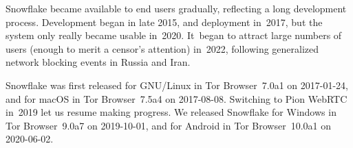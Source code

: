 \documentclass[letterpaper,twocolumn]{article}
\begin{document}
Snowflake became available to end users gradually,
reflecting a long development process.
Development began in late 2015,
and deployment in~2017,
but the system only really became usable in~2020.
It~began to attract large numbers of users
(enough to merit a censor's attention)
in~2022, following generalized
network blocking events in Russia and Iran.

Snowflake
was first released for GNU/Linux
in Tor Browser~7.0a1 on \mbox{2017-01-24},
and for macOS
in Tor Browser~7.5a4 on \mbox{2017-08-08}.
Switching to
Pion WebRTC~\cite{pion-webrtc} in~2019
let us resume making progress.
We released Snowflake for Windows
in Tor Browser~9.0a7 on \mbox{2019-10-01},
and for Android in
Tor Browser~10.0a1 on \mbox{2020-06-02}.
\end{document}
